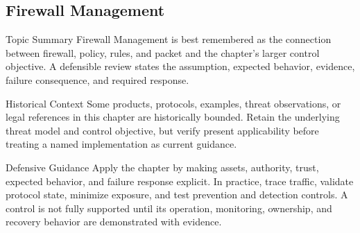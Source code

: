 \documentclass[11pt,letterpaper]{article}
\begin{document}
\subsection*{Firewall Management}
\begin{CornellNotesTable}
\end{CornellNotesTable}
\begin{CornellSummaryBox}{Topic Summary}
Firewall Management is best remembered as the connection between firewall, policy, rules, and packet and the chapter's larger control objective. A defensible review states the assumption, expected behavior, evidence, failure consequence, and required response.
\end{CornellSummaryBox}
\begin{CornellWarningBox}{Historical Context}
Some products, protocols, examples, threat observations, or legal references in this chapter are historically bounded. Retain the underlying threat model and control objective, but verify present applicability before treating a named implementation as current guidance.
\end{CornellWarningBox}
\begin{CornellOverviewBox}{Defensive Guidance}
Apply the chapter by making assets, authority, trust, expected behavior, and failure response explicit. In practice, trace traffic, validate protocol state, minimize exposure, and test prevention and detection controls. A control is not fully supported until its operation, monitoring, ownership, and recovery behavior are demonstrated with evidence.
\end{CornellOverviewBox}
\end{document}
